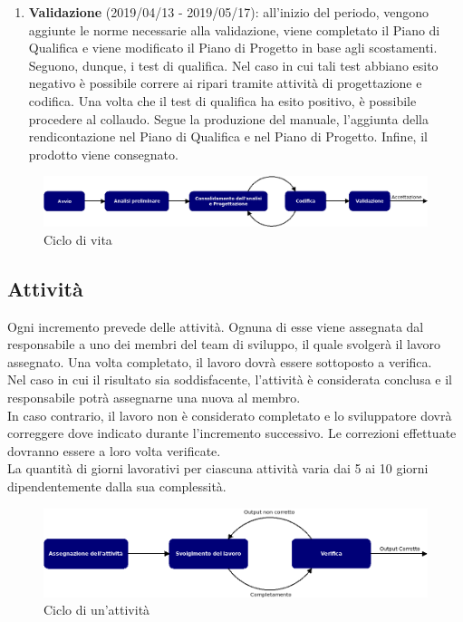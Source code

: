 \begin{enumerate}
	\item \textbf{Validazione} (2019/04/13 - 2019/05/17): all'inizio del periodo, vengono aggiunte le norme necessarie alla validazione, viene completato il Piano di Qualifica e viene modificato il Piano di Progetto in base agli scostamenti. Seguono, dunque, i test di qualifica. Nel caso in cui tali test abbiano esito negativo è possibile correre ai ripari tramite attività di progettazione e codifica. Una volta che il test di qualifica ha esito positivo, è possibile procedere al collaudo. Segue la produzione del manuale, l'aggiunta della rendicontazione nel Piano di Qualifica e nel Piano di Progetto. Infine, il prodotto viene consegnato.
\end{enumerate}

\begin{figure}[h]
	\centering
	\includegraphics[scale=0.4]{images/Model/model.png}
	\caption{Ciclo di vita}
\end{figure}

\subsection{Attività}
Ogni incremento prevede delle attività. Ognuna di esse viene assegnata dal responsabile a uno dei membri del team di sviluppo, il quale svolgerà il lavoro assegnato. Una volta completato, il lavoro dovrà essere sottoposto a verifica.\\
Nel caso in cui il risultato sia soddisfacente, l'attività è considerata conclusa e il responsabile potrà assegnarne una nuova al membro.\\ 
In caso contrario, il lavoro non è considerato completato e lo sviluppatore dovrà correggere dove indicato durante l'incremento successivo. Le correzioni effettuate dovranno essere a loro volta verificate.\\
La quantità di giorni lavorativi per ciascuna attività varia dai 5 ai 10 giorni dipendentemente dalla sua complessità.

\begin{figure}[h]
	\centering
	\includegraphics[scale=0.45]{images/Model/activity.png}
	\caption{Ciclo di un'attività}
\end{figure}
